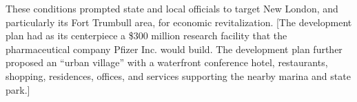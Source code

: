 These conditions prompted state and local officials to target New London, and
particularly its Fort Trumbull area, for economic revitalization.
[The development plan had as its centerpiece a \$300 million research facility
that the pharmaceutical company Pfizer Inc. would build. The development plan
further proposed an ``urban village'' with a waterfront conference hotel,
restaurants, shopping, residences, offices, and services supporting the nearby
marina and state park.]
%

